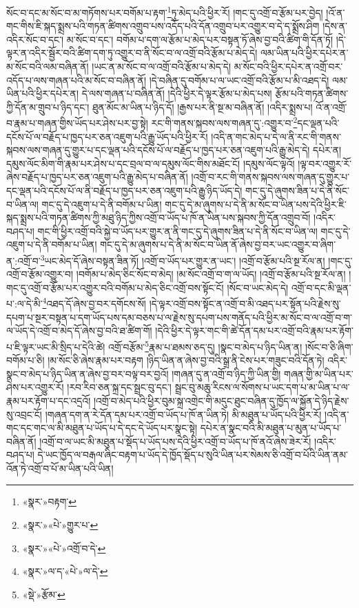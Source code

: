 སོང་བ་དང་མ་སོང་བ་མ་གཏོགས་པར་བགོམ་པ་རྟག་\footnote{«སྣར་»བརྟག་}ཏུ་མེད་པའི་ཕྱིར་རོ། །གང་དུ་འགྲོ་བ་རྩོམ་པར་བྱེད། །འོ་ན་གང་གིས་ཇི་སྐད་སྨྲས་པའི་གཏན་ཚིགས་འགྲུབ་པས་འདོད་པའི་དོན་འགྲུབ་པར་འགྱུར་བ་དེ་ད་སྨྲོས་ཤིག །དེས་ན་འདིར་སོང་བ་དང་། མ་སོང་བ་དང་། བགོམ་པ་དག་ལ་རྩོམ་པ་མེད་པར་བསྟན་ཏོ་ཞེས་བྱ་བའི་ཚིག་གི་དོན་ཏོ། །དེ་ལྟར་ན་འདིར་སྦྱོར་བའི་ཚིག་དག་ཏུ་འགྱུར་བ་ནི་སོང་བ་ལ་འགྲོ་བའི་རྩོམ་པ་མེད་དེ། ལམ་ཡིན་པའི་ཕྱིར་དཔེར་ན་མ་སོང་བའི་ལམ་བཞིན་ནོ། །ཡང་ན་མ་སོང་བ་ལ་འགྲོ་བའི་རྩོམ་པ་མེད་དེ། མ་སོང་བའི་ཕྱིར་དཔེར་ན་འགྲོ་བར་འདོད་པ་ལས་གཞན་པའི་མ་སོང་བ་བཞིན་ནོ། །དེ་བཞིན་དུ་བགོམ་པ་ལ་ཡང་འགྲོ་བའི་རྩོམ་པ་མི་འཐད་དེ། ལམ་ཡིན་པའི་ཕྱིར་དཔེར་ན། དེ་ལས་གཞན་པ་བཞིན་ནོ། །དེའི་ཕྱིར་དེ་ལྟར་རྩོམ་པ་མེད་པས། རྩོམ་པའི་གཏན་ཚིགས་ཀྱི་དོན་མ་གྲུབ་པ་ཉིད་དང་། ཐུན་མོང་མ་ཡིན་པ་ཉིད་དོ། །རྒྱས་པར་ནི་སྔ་མ་བཞིན་ནོ། །འདིར་སྨྲས་པ། འོ་ན་འགྲོ་བ་རྣམ་པ་གཞན་གྱིས་ཡོད་པར་ཤེས་པར་བྱ་སྟེ། རང་གི་གནས་སྐབས་ལས་གཞན་དུ་:འགྱུར་བ་\footnote{«སྣར་»«པེ་»གྱུར་པ་}དང་ལྡན་པའི་དངོས་པོ་ལ་བརྗོད་པ་ཁྱད་པར་ཅན་འཇུག་པའི་རྒྱུ་ཡོད་པའི་ཕྱིར་རོ། །འདི་ན་གང་མེད་པ་དེ་ལ་ནི་རང་གི་གནས་སྐབས་ལས་གཞན་དུ་གྱུར་པ་དང་ལྡན་པའི་དངོས་པོ་ལ་བརྗོད་པ་ཁྱད་པར་ཅན་འཇུག་པའི་རྒྱུ་མེད་དེ། དཔེར་ན། དམུས་ལོང་མིག་གི་རྣམ་པར་ཤེས་པ་དང་བྲལ་བ་ལ་དམུས་ལོང་གིས་མཐོང་ངོ། །དམུས་ལོང་ལྟའོ། །ལྟ་བར་འགྱུར་རོ་ཞེས་བརྗོད་པ་ཁྱད་པར་ཅན་འཇུག་པའི་རྒྱུ་མེད་པ་བཞིན་ནོ། །འགྲོ་བ་རང་གི་གནས་སྐབས་ལས་གཞན་དུ་གྱུར་པ་དང་ལྡན་པའི་དངོས་པོ་ལ་ནི་བརྗོད་པ་ཁྱད་པར་ཅན་འཇུག་པའི་རྒྱུ་ཉིད་ཡོད་དེ། གང་དུ་དེ་ཞུགས་ཟིན་པ་དེ་ནི་སོང་བ་ཡིན་ལ། གང་དུ་དེ་འཇུག་པ་དེ་ནི་བགོམ་པ་ཡིན། གང་དུ་དེ་མ་ཞུགས་པ་དེ་ནི་མ་སོང་བ་ཡིན་པས་དེའི་ཕྱིར་ཇི་སྐད་སྨྲས་པའི་གཏན་ཚིགས་ཀྱི་མཐུ་ཉིད་ཀྱིས་འགྲོ་བ་ཡོད་པ་ཁོ་ན་ཡིན་པས་སྐབས་ཀྱི་དོན་འགྲུབ་བོ། །འདིར་བཤད་པ། གང་གི་ཕྱིར་འགྲོ་བའི་སྐྱེ་བ་ཡོད་པར་གྱུར་ན་ནི་གང་དུ་དེ་ཞུགས་ཟིན་པ་དེ་ནི་སོང་བ་ཡིན་ལ། གང་དུ་དེ་འཇུག་པ་དེ་ནི་བགོམ་པ་ཡིན། གང་དུ་དེ་མ་ཞུགས་པ་དེ་ནི་མ་སོང་བ་ཡིན་ནོ་ཞེས་བྱ་བར་ཡང་འགྱུར་བ་ཞིག་ན་:འགྲོ་བ་\footnote{«སྣར་»«པེ་»འགྲོ་བ་དེ་}ཡང་མེད་དོ་ཞེས་བསྟན་ཟིན་ཏོ། །འགྲོ་བ་ཡོད་པར་གྱུར་ན་ཡང་། །འགྲོ་བ་རྩོམ་པའི་སྔ་རོལ་ན། །གང་དུ་འགྲོ་བ་རྩོམ་འགྱུར་བ། །བགོམ་པ་མེད་ཅིང་སོང་བ་མེད། །མ་སོང་འགྲོ་བ་ག་ལ་ཡོད། །འགྲོ་བ་རྩོམ་པའི་སྔ་རོལ་ན། །གང་དུ་འགྲོ་བ་རྩོམ་པར་འགྱུར་བའི་བགོམ་པ་མེད་ཅིང་འགྲོ་བས་སྟོང་ངོ། །སོང་བ་ཡང་མེད་དེ། འགྲོ་བ་དང་མི་ལྡན་པ་:ལ་དེ་མི་\footnote{«སྣར་»ལ་ད་«པེ་»ལ་དེ་}འཐད་དོ་ཞེས་བྱ་བར་དགོངས་སོ། །དེ་ལྟར་འགྲོ་བས་སྟོང་ན་འགྲོ་བ་མི་འཐད་པར་སྟོན་པའི་རྗེས་སུ་དཔག་པ་སྔར་བསྟན་པ་དག་ཡོད་པས་དམ་བཅས་པ་ལ་རྗེས་སུ་དཔག་པས་གནོད་པའི་ཕྱིར་མ་སོང་བ་ལ་འགྲོ་བ་ག་ལ་ཡོད་དེ་འགྲོ་བ་མེད་དོ་ཞེས་བྱ་བའི་ཐ་ཚིག་གོ། །དེའི་ཕྱིར་དེ་ལྟར་གང་གི་ཚེ་དོན་དམ་པར་འགྲོ་བའི་རྣམ་པར་རྟོག་པ་ཇི་ལྟར་ཡང་མི་སྲིད་པ་དེའི་ཚེ། འགྲོ་བརྩོམ་\footnote{«སྡེ་»རྩོམ་}རྣམ་པ་ཐམས་ཅད་དུ། །སྣང་བ་མེད་པ་ཉིད་ཡིན་ན། །སོང་བ་ཅི་ཞིག་བགོམ་པ་ཅི། །མ་སོང་ཅི་ཞེས་རྣམ་པར་བརྟག །ཉིད་ཡིན་ན་ཞེས་བྱ་བའི་སྒྲ་ནི་ངེས་པར་གཟུང་བའི་དོན་ཏེ། འདིར་སྣང་བ་མེད་པ་ཉིད་ཡིན་ན་ཞེས་བྱ་བར་བལྟ་བར་བྱའོ། །གཞན་དུ་ན་འགྲོ་བ་ཉིད་ཀྱི་ཡིན་གྱི། གཞན་གྱི་མ་ཡིན་པར་ཤེས་པར་འགྱུར་རོ། །རབ་རིབ་ཅན་སྐྲ་དང་སྦྲང་བུ་དང་། སྦྲང་བུ་མཆུ་རིངས་ལ་སོགས་པ་ཡང་དག་པ་མ་ཡིན་པ་ལ་རྣམ་པར་རྟོག་པ་དང་འདྲའོ། །འགྲོ་བ་མེད་པའི་ཕྱིར་བུམ་སྐྲ་འགྲེང་གི་མདུང་ཐུང་བཞིན་དུ་ཁྱོད་ལ་སྐྱོན་དེ་ཉིད་རྗེས་སུ་འབྲང་ངོ། །གཞན་དག་ན་རེ་དོན་དམ་པར་འགྲོ་བ་ཡོད་པ་ཁོ་ན་ཡིན་ཏེ། མི་མཐུན་པ་ཡོད་པའི་ཕྱིར་རོ། །འདི་ན་གང་དང་གང་ལ་མི་མཐུན་པ་ཡོད་པ་དེ་དང་དེ་ཡོད་པར་སྣང་སྟེ། དཔེར་ན་སྣང་བའི་མི་མཐུན་པ་མུན་པ་ཡོད་པ་བཞིན་ནོ། །འགྲོ་བ་ལ་ཡང་མི་མཐུན་པ་སྡོད་པ་ཡོད་པས་དེའི་ཕྱིར་འགྲོ་བ་ཡོད་པ་ཁོ་ནའོ་ཞེས་ཟེར་རོ། །འདིར་བཤད་པ། དེ་ཡང་ཁྱོད་ལ་བརྒལ་ཞིང་བརྟག་པ་ཡོད་དེ་ཁྱོད་སྡོད་པ་སུའི་ཡིན་པར་སེམས་ཅི་འགྲོ་བ་པོའི་ཡིན་ནམ་འོན་ཏེ་འགྲོ་བ་པོ་མ་ཡིན་པའི་ཡིན། 